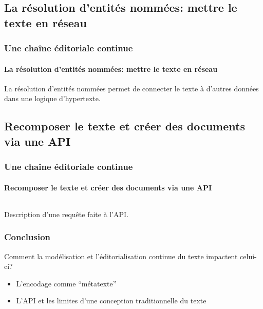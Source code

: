 \documentclass{beamer}
\begin{document}
\subsection{La résolution d'entités nommées: mettre le texte en réseau}
\begin{frame}
	\frametitle{Une chaîne éditoriale continue}
	\framesubtitle{La résolution d'entités nommées: mettre le texte en réseau}
	
	La résolution d'entités nommées permet de connecter le texte à d'autres données dans une logique d'hypertexte.
\end{frame}

\subsection{Recomposer le texte et créer des documents via une API}
\begin{frame}
	\frametitle{Une chaîne éditoriale continue}
	\framesubtitle{Recomposer le texte et créer des documents via une API}
	
	\begin{listing}[h]
		\centering
		\inputminted{xml}{includes/api.xml}
		\caption{Description d'une requête faite à l'API.}
	\end{listing}
\end{frame}

\begin{frame}
	\frametitle{Conclusion}
	
	Comment la modélisation et l'éditorialisation continue du texte impactent celui-ci?
	\begin{itemize}
		\item L'encodage comme \enquote{métatexte}
		\item L'API et les limites d'une conception traditionnelle du texte
	\end{itemize}
\end{frame}
\end{document}
